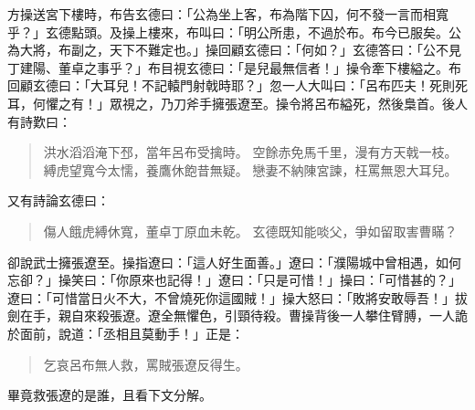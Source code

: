 方操送宮下樓時，布告玄德曰：「公為坐上客，布為階下囚，何不發一言而相寬乎？」玄德點頭。及操上樓來，布叫曰：「明公所患，不過於布。布今已服矣。公為大將，布副之，天下不難定也。」操回顧玄德曰：「何如？」玄德答曰：「公不見丁建陽、董卓之事乎？」布目視玄德曰：「是兒最無信者！」操令牽下樓縊之。布回顧玄德曰：「大耳兒！不記轅門射戟時耶？」忽一人大叫曰：「呂布匹夫！死則死耳，何懼之有！」眾視之，乃刀斧手擁張遼至。操令將呂布縊死，然後梟首。後人有詩歎曰：

\begin{quote}
洪水滔滔淹下邳，當年呂布受擒時。
空餘赤免馬千里，漫有方天戟一枝。
縛虎望寬今太懦，養鷹休飽昔無疑。
戀妻不納陳宮諫，枉罵無恩大耳兒。
\end{quote}

又有詩論玄德曰：

\begin{quote}
傷人餓虎縛休寬，董卓丁原血未乾。
玄德既知能啖父，爭如留取害曹瞞？
\end{quote}

卻說武士擁張遼至。操指遼曰：「這人好生面善。」遼曰：「濮陽城中曾相遇，如何忘卻？」操笑曰：「你原來也記得！」遼曰：「只是可惜！」操曰：「可惜甚的？」遼曰：「可惜當日火不大，不曾燒死你這國賊！」操大怒曰：「敗將安敢辱吾！」拔劍在手，親自來殺張遼。遼全無懼色，引頸待殺。曹操背後一人攀住臂膊，一人詭於面前，說道：「丞相且莫動手！」正是：

\begin{quote}
乞哀呂布無人救，罵賊張遼反得生。
\end{quote}

畢竟救張遼的是誰，且看下文分解。
